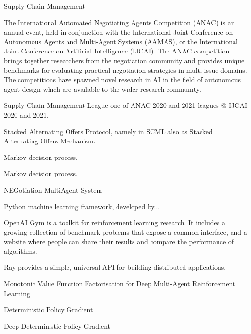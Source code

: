 
%
{%
Supply Chain Management}

%
{%
The International Automated Negotiating Agents Competition (ANAC) is an annual event, held in conjunction with the International Joint Conference on Autonomous Agents and Multi-Agent Systems (AAMAS), or the International Joint Conference on Artificial Intelligence (IJCAI). The ANAC competition brings together researchers from the negotiation community and provides unique benchmarks for evaluating practical negotiation strategies in multi-issue domains. The competitions have spawned novel research in AI in the field of autonomous agent design which are available to the wider research community.
}

%
{%
Supply Chain Management League one of ANAC 2020 and 2021 leagues @ IJCAI 2020 and 2021.}

%
{%
Stacked Alternating Offers Protocol, namely in SCML also as Stacked Alternating Offers Mechanism.
}

%
{%
Markov decision process.
}

%
{%
Markov decision process.
}

%
{%
NEGotiation MultiAgent System
}

%
{%
Python machine learning framework, developed by...
}

%
{%
OpenAI Gym is a toolkit for reinforcement learning research. It includes a growing collection of benchmark problems that expose a common interface, and a website where people can share their results and compare the performance of algorithms.
}

%
{%
Ray provides a simple, universal API for building distributed applications.
}

%
{%
Monotonic Value Function Factorisation for Deep Multi-Agent Reinforcement Learning
}

%
{%
Deterministic Policy Gradient
}

%
{%
Deep Deterministic Policy Gradient
}

